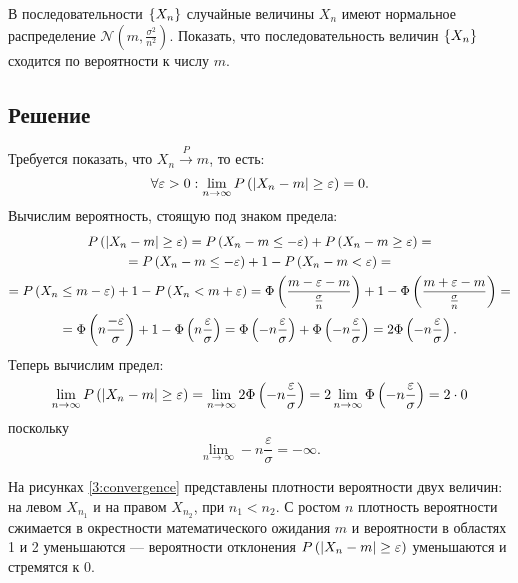 В последовательности $\left \{ X_n \right \}$ случайные величины $X_n$ имеют нормальное распределение $\mathcal{N} \left ( m, \frac{\sigma^2}{n^2} \right )$.
Показать, что последовательность величин $\left \{ X_n \right \}$ сходится по вероятности к числу $m$.

\subsection*{Решение}
Требуется показать, что $X_n \stackrel{P}{\longrightarrow} m$, то есть:
\begin{equation}
    \forall \varepsilon > 0: \lim_{n \rightarrow \infty} P \left (  \left |  X_n - m  \right | \ge \varepsilon  \right ) = 0 .
\end{equation}
Вычислим вероятность, стоящую под знаком предела:
\begin{multline}
    P \left ( \left |  X_n - m  \right | \ge \varepsilon \right )
    = P \left ( X_n - m \le - \varepsilon \right ) + P \left ( X_n - m \ge \varepsilon \right ) = \\
    = P \left ( X_n - m \le - \varepsilon \right ) + 1 - P \left ( X_n - m < \varepsilon \right ) = \\
    = P \left ( X_n \le m - \varepsilon \right ) + 1 - P \left ( X_n < m + \varepsilon \right )
    = \Phi \left ( \frac{ m - \varepsilon - m}{\frac{\sigma}{n}} \right ) + 1 - \Phi \left ( \frac{m + \varepsilon - m}{\frac{\sigma}{n}} \right ) = \\
    = \Phi \left ( n \frac{-\varepsilon}{\sigma} \right ) + 1 - \Phi \left ( n \frac{\varepsilon}{\sigma} \right )
    = \Phi \left ( - n \frac{\varepsilon}{\sigma} \right ) + \Phi \left ( - n \frac{\varepsilon}{\sigma} \right )
    = 2 \Phi \left ( - n \frac{\varepsilon}{\sigma} \right ).
\end{multline}
Теперь вычислим предел:
\begin{equation}
    \lim_{n \rightarrow \infty} P \left ( \left |  X_n - m  \right | \ge \varepsilon \right )
    = \lim_{n \rightarrow \infty} 2 \Phi \left ( - n \frac{\varepsilon}{\sigma} \right )
    = 2 \lim_{n \rightarrow \infty} \Phi \left ( - n \frac{\varepsilon}{\sigma} \right )
    = 2 \cdot 0
\end{equation}
поскольку
\begin{equation}
    \lim_{n \rightarrow \infty} - n \frac{\varepsilon}{\sigma} = - \infty .
\end{equation}

На рисунках \ref{3:convergence} представлены плотности вероятности двух величин: на левом $X_{n_1}$ и на правом $X_{n_2}$, при $n_1 < n_2$. С ростом $n$ плотность
вероятности сжимается в окрестности математического ожидания $m$ и вероятности в областях 1 и 2 уменьшаются --- вероятности отклонения
$P \left (  \left |  X_n - m  \right | \ge \varepsilon  \right )$ уменьшаются и стремятся к 0.

